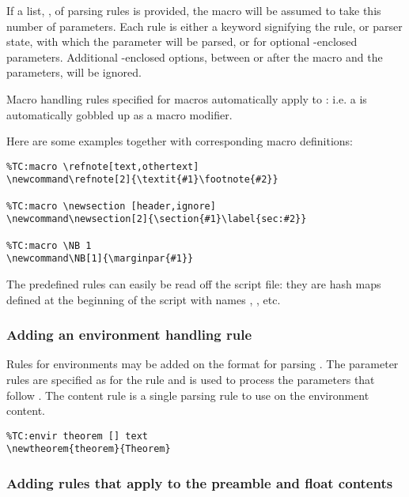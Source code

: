 \documentclass{article}
\begin{document}
If a list, , of parsing rules is provided, the macro will be assumed to take this number of parameters. Each rule is either a keyword signifying the rule, or parser state, with which the parameter will be parsed, or  for optional \code{[]}-enclosed parameters. Additional \code{[]}-enclosed options, between or after the macro and the parameters, will be ignored.

Macro handling rules specified for macros  automatically apply to : i.e. a \code{*} is automatically gobbled up as a macro modifier. 

Here are some examples together with corresponding macro definitions:

\begin{lstlisting}
%TC:macro \refnote[text,othertext]
\newcommand\refnote[2]{\textit{#1}\footnote{#2}}

%TC:macro \newsection [header,ignore]
\newcommand\newsection[2]{\section{#1}\label{sec:#2}}

%TC:macro \NB 1
\newcommand\NB[1]{\marginpar{#1}}
\end{lstlisting}

The predefined rules can easily be read off the script file: they are hash maps defined at the beginning of the script with names , , etc.

\subsubsection{Adding an environment handling rule}

Rules for environments may be added on the format
for parsing . The parameter rules are specified as for the  rule and is used to process the parameters that follow . The content rule is a single parsing rule to use on the environment content.

\begin{lstlisting}
%TC:envir theorem [] text
\newtheorem{theorem}{Theorem}
\end{lstlisting}

\subsubsection{Adding rules that apply to the preamble and float contents}
\end{document}
